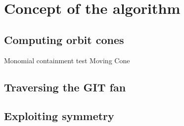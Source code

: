 \chapter{Concept of the algorithm}

\section{Computing orbit cones}
Monomial containment test
Moving Cone
\section{Traversing the GIT fan}
\section{Exploiting symmetry}